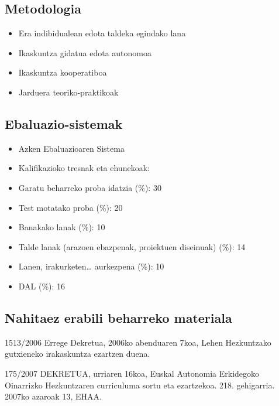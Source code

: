\documentclass[
]{book}
\providecommand{\tightlist}{%
  \setlength{\itemsep}{0pt}\setlength{\parskip}{0pt}}
\begin{document}
\hypertarget{metodologia}{%
\subsection*{Metodologia}\label{metodologia}}

\begin{itemize}
\tightlist
\item
  Era indibidualean edota taldeka egindako lana
\item
  Ikaskuntza gidatua edota autonomoa
\item
  Ikaskuntza kooperatiboa
\item
  Jarduera teoriko-praktikoak
\end{itemize}

\hypertarget{ebaluazio-sistemak}{%
\subsection*{Ebaluazio-sistemak}\label{ebaluazio-sistemak}}

\begin{itemize}
\tightlist
\item
  Azken Ebaluazioaren Sistema
\item
  Kalifikazioko tresnak eta ehunekoak:
\item
  Garatu beharreko proba idatzia (\%): 30
\item
  Test motatako proba (\%): 20
\item
  Banakako lanak (\%): 10
\item
  Talde lanak (arazoen ebazpenak, proiektuen diseinuak) (\%): 14
\item
  Lanen, irakurketen\ldots{} aurkezpena (\%): 10
\item
  DAL (\%): 16
\end{itemize}

\hypertarget{nahitaez-erabili-beharreko-materiala}{%
\subsection*{Nahitaez erabili beharreko materiala}\label{nahitaez-erabili-beharreko-materiala}}

1513/2006 Errege Dekretua, 2006ko abenduaren 7koa, Lehen Hezkuntzako gutxieneko irakaskuntza ezartzen duena.

175/2007 DEKRETUA, urriaren 16koa, Euskal Autonomia Erkidegoko Oinarrizko Hezkuntzaren curriculuma sortu eta ezartzekoa. 218. gehigarria. 2007ko azaroak 13, EHAA.
\end{document}
